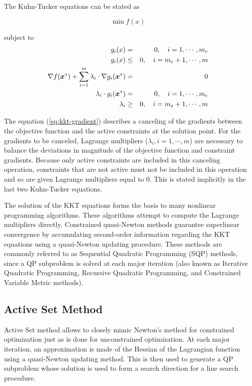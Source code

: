 \documentclass[journal,comsoc]{IEEEtran}
\begin{document}
The Kuhn-Tucker equations can be stated as

\begin{equation}
	\min f(x)
\end{equation}

subject to 
\begin{eqnarray}
	g_i(x) & = & 0, \quad i = 1, \cdots , m_e\\
	g_i(x) & \leq & 0, \quad i = m_e+1, \cdots, m \\
	\nabla f(\mbox{\boldmath $x$}^*) + \sum_{i=1}^m \lambda_i \cdot \nabla g_i(\mbox{\boldmath $x$}^*) & = & 0 \label{eq:kkt-gradient}\\
	\lambda_i \cdot g_i(\mbox{\boldmath $x$}^*) & = & 0, \quad i = 1, \cdots , m_e\\
	\lambda_i & \geq & 0, \quad  i = m_e+1, \cdots, m
\end{eqnarray}

The equation (\ref{eq:kkt-gradient}) describes a canceling of the gradients between the objective function and the active constraints at the solution point. For the gradients to be canceled, Lagrange multipliers ($\lambda_i, i = 1,\cdots,m$) are necessary to balance the deviations in magnitude of the objective function and constraint gradients. Because only active constraints are included in this canceling operation, constraints that are not active must not be included in this operation and so are given Lagrange multipliers equal to 0. This is stated implicitly in the last two Kuhn-Tucker equations.

The solution of the KKT equations forms the basis to many nonlinear programming algorithms. These algorithms attempt to compute the Lagrange multipliers directly. Constrained quasi-Newton methods guarantee superlinear convergence by accumulating second-order information regarding the KKT equations using a quasi-Newton updating procedure. These methods are commonly referred to as Sequential Quadratic Programming (SQP) methods, since a QP subproblem is solved at each major iteration (also known as Iterative Quadratic Programming, Recursive Quadratic Programming, and Constrained Variable Metric methods).

\subsection{Active Set Method}

 Active Set method allows to closely mimic Newton's method for constrained optimization just as is done for unconstrained optimization. At each major iteration, an approximation is made of the Hessian of the Lagrangian function using a quasi-Newton updating method. This is then used to generate a QP subproblem whose solution is used to form a search direction for a line search procedure. 
 
\end{document}
